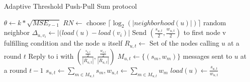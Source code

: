 \begin{algorithm}
    \caption{Adaptive Threshold Push-Pull Sum protocol}\label{alg:PPS}
    \begin{algorithmic}[1]
    \State $\theta \leftarrow k * \sqrt{MSE_{r-1}}$ 
    \EndProcedure
    \State $RN \leftarrow$ choose $\lceil \log_{2}{(|neighborhood(u)|)} \rceil$ random neighbor
    \State $\Delta_{u, v_{i}} \leftarrow |(load(u) - load(v_{i})|$
    \State Send $(\frac{s_{u,t}}{2}, \frac{w_{u,t}}{2})$ to first node v fulfilling condition and the node $u$ itself
    \EndIf
    \EndFor
    \EndProcedure
    \State $R_{u,t} \leftarrow$ Set of the nodes calling $u$ at a round $t$
    \State Reply to i with $\left( \frac{\frac{s_{u,t}}{2}}{|R_{u,t}|}, \frac{\frac{w_{u,t}}{2}}{|R_{u,t}|} \right)$
    \EndFor
    \EndProcedure
    \State $M_{u,t} \leftarrow \{(s_{m}, w_{m})\}$ messages sent to $u$ at a round $t-1$
    \State $s_{u,t} \leftarrow \sum_{m \in M_{u,t}}^{}s_{m}, w_{u,t} \leftarrow\sum_{m \in M_{u,t}}^{}w_{m}$
    \State $load(u) \leftarrow \frac{s_{u,t}}{w_{u,t}}$
    \EndProcedure
    \end{algorithmic}
    \end{algorithm}